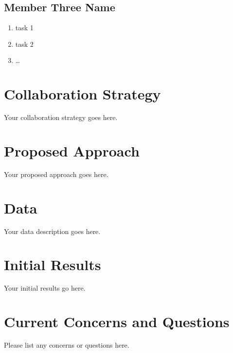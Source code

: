 \documentclass[10pt,twocolumn,letterpaper]{article}
\begin{document}
\subsection{Member Three Name}

\begin{enumerate}

\item task 1
\item task 2
\item \ldots

\end{enumerate}

\section{Collaboration Strategy}

Your collaboration strategy goes here.

\section{Proposed Approach}

Your proposed approach goes here.

\section{Data}

Your data description goes here.

\section{Initial Results}

Your initial results go here.

\section{Current Concerns and Questions}

Please list any concerns or questions here.

{\small


}
\end{document}

